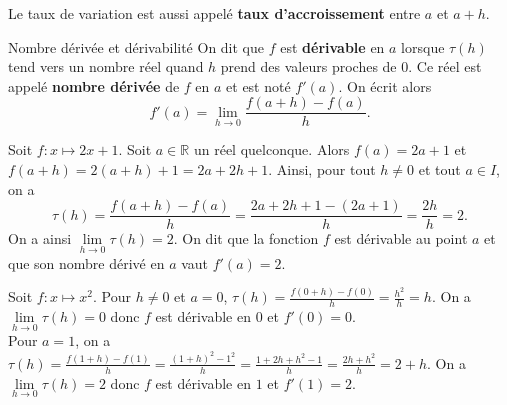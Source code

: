 \documentclass[11pt]{article}
\begin{document}
\begin{rmq}
  Le taux de variation est aussi appelé \textbf{taux d'accroissement} entre $a$
  et $a+h$.
\end{rmq}

\begin{defi}{Nombre dérivée et dérivabilité}
  On dit que $f$ est \textbf{dérivable} en $a$ lorsque $\tau(h)$ tend vers un
  nombre réel quand $h$ prend des valeurs proches de $0$. Ce réel est appelé
  \textbf{nombre dérivée} de $f$ en $a$ et est noté $f'(a)$. On écrit alors
  \[
    f'(a) = \underset{h\to0}{\lim}\frac{f(a+h)-f(a)}{h}.
  \]
\end{defi}

\begin{exemple}
  Soit $f:x\mapsto 2x+1$. Soit $a\in\mathbb{R}$ un réel quelconque. Alors
  $f(a)=2a+1$ et $f(a+h)=2(a+h)+1=2a+2h+1$. Ainsi,
  pour tout $h\neq0$ et tout $a\in I$, on a
  \[
    \tau(h) = \frac{f(a+h)-f(a)}{h} = \frac{2a+2h+1-(2a+1)}{h} =
    \frac{2h}{h}=2.
  \]
  On a ainsi $\underset{h\to0}{\lim}\tau(h)=2$. On dit que la fonction $f$ est
  dérivable au point $a$ et que son nombre dérivé en $a$ vaut $f'(a)=2$.
\end{exemple}

\begin{exemple}
  Soit $f:x\mapsto x^2$. Pour $h\neq0$ et $a=0$,
  $\tau(h)=\frac{f(0+h)-f(0)}{h}=\frac{h^2}{h}=h$. On a
  $\underset{h\to0}{\lim}\tau(h)=0$ donc $f$ est dérivable en $0$ et $f'(0)=0$.
  \\Pour $a=1$, on a
  $\tau(h)=\frac{f(1+h)-f(1)}{h}=\frac{(1+h)^2-1^2}{h}=\frac{1+2h+h^2-1}{h} =
  \frac{2h + h^2}{h} = 2 +
  h$. On a $\underset{h\to0}{\lim}\tau(h)=2$ donc $f$ est dérivable en $1$ et $f'(1)=2$.
\end{exemple}
\end{document}
